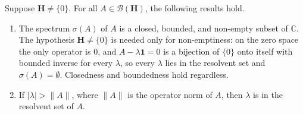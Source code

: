 \begin{proposition}
    \label{prpstn:hall-7.5}
    \leanok
    Suppose $\mathbf{H} \ne \{0\}$. For all $A \in \mathcal{B}(\mathbf{H})$, the following results hold.
    \begin{enumerate}
        \item The spectrum $\sigma(A)$ of $A$ is a closed, bounded, and non-empty subset of $\mathbb{C}$.
        The hypothesis $\mathbf{H} \ne \{0\}$ is needed only for non-emptiness: on the zero space the only operator is $0$, and $A - \lambda\mathbf{1} = 0$ is a bijection of $\{0\}$ onto itself with bounded inverse for every $\lambda$, so every $\lambda$ lies in the resolvent set and $\sigma(A) = \emptyset$. Closedness and boundedness hold regardless.
        \item If $\lvert \lambda \rvert > \|A\|$, where $\|A\|$ is the operator norm of $A$, then $\lambda$ is in the resolvent set of $A$.
    \end{enumerate}
\end{proposition}
